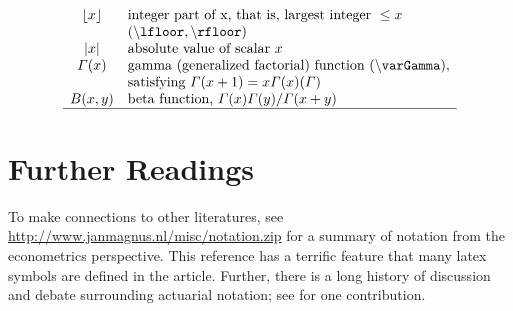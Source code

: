 \documentclass[
]{book}
\begin{document}
\[\begin{array}{cl}
\lfloor x\rfloor & \text{integer part of x, that is, largest integer }\leq x \\
                 & (\backslash\tt{lfloor}, \backslash\tt{rfloor}) \\
|x|        & \text{absolute value of scalar }x \\
\varGamma(x) & \text{gamma (generalized factorial) function } (\backslash\tt{varGamma}),\\
           & \text{satisfying }\varGamma(x+1)=x\varGamma(x) (\tt{\varGamma}) \\
B(x,y)     & \text{beta function, }\varGamma(x)\varGamma(y)/\varGamma(x+y) \\
\hline
\end{array}
\]

\hypertarget{further-readings}{%
\section{Further Readings}\label{further-readings}}

To make connections to other literatures, see \citep{abadir2002notation} \url{http://www.janmagnus.nl/misc/notation.zip} for a summary of notation from the econometrics perspective. This reference has a terrific feature that many latex symbols are defined in the article. Further, there is a long history of discussion and debate surrounding actuarial notation; see \citep{boehm1975thoughts} for one contribution.

  
\end{document}
